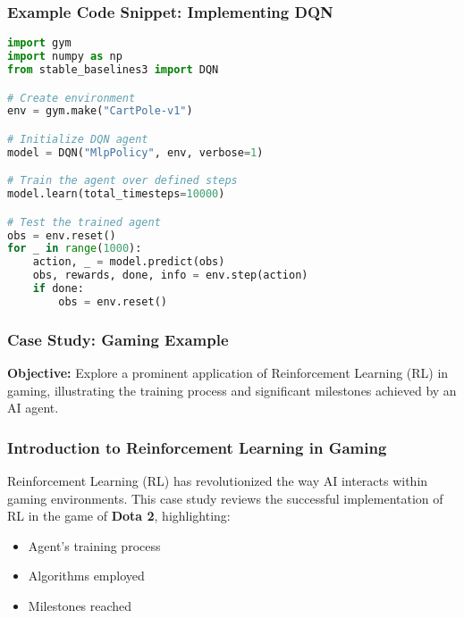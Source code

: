 \documentclass[aspectratio=169]{beamer}
\begin{document}
\begin{frame}[fragile]
    \frametitle{Example Code Snippet: Implementing DQN}
    \begin{lstlisting}[language=Python]
import gym
import numpy as np
from stable_baselines3 import DQN

# Create environment
env = gym.make("CartPole-v1")

# Initialize DQN agent
model = DQN("MlpPolicy", env, verbose=1)

# Train the agent over defined steps
model.learn(total_timesteps=10000)

# Test the trained agent
obs = env.reset()
for _ in range(1000):
    action, _ = model.predict(obs)
    obs, rewards, done, info = env.step(action)
    if done:
        obs = env.reset()
    \end{lstlisting}
\end{frame}

\begin{frame}[fragile]
    \frametitle{Case Study: Gaming Example}
    
    \textbf{Objective:} Explore a prominent application of Reinforcement Learning (RL) in gaming, illustrating the training process and significant milestones achieved by an AI agent.
    
\end{frame}

\begin{frame}[fragile]
    \frametitle{Introduction to Reinforcement Learning in Gaming}

    Reinforcement Learning (RL) has revolutionized the way AI interacts within gaming environments. This case study reviews the successful implementation of RL in the game of \textbf{Dota 2}, highlighting:

    \begin{itemize}
        \item Agent's training process
        \item Algorithms employed
        \item Milestones reached
    \end{itemize}
    
\end{frame}
\end{document}
